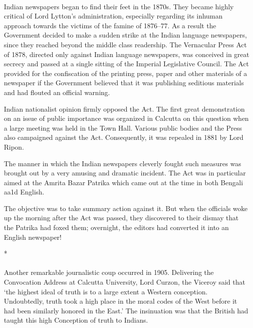 \paragraph*{}

Indian newspapers began to find their feet in the 1870s. They became highly critical of Lord Lytton's administration, especially regarding its inhuman approach towards the victims of the famine of 1876--77. As a result the Government decided to make a sudden strike at the Indian language newspapers, since they reached beyond the middle class readership. The Vernacular Press Act of 1878, directed only against Indian language newspapers, was conceived in great secrecy and passed at a single sitting of the Imperial Legislative Council. The Act provided for the confiscation of the printing press, paper and other materials of a newspaper if the Government believed that it was publishing seditious materials and had flouted an official warning.

Indian nationalist opinion firmly opposed the Act. The first great demonstration on an issue of public importance was organized in Calcutta on this question when a large meeting was held in the Town Hall. Various public bodies and the Press also campaigned against the Act. Consequently, it was repealed in 1881 by Lord Ripon.

The manner in which the Indian newspapers cleverly fought such measures was brought out by a very amusing and dramatic incident. The Act was in particular aimed at the Amrita Bazar Patrika which came out at the time in both Bengali aa1d English.

The objective was to take summary action against it. But when the officials woke up the morning after the Act was passed, they discovered to their dismay that the Patrika had foxed them; overnight, the editors had converted it into an English newspaper!

\begin{center}*\end{center}

\paragraph*{}

Another remarkable journalistic coup occurred in 1905. Delivering the Convocation Address at Calcutta University, Lord Curzon, the Viceroy said that `the highest ideal of truth is to a large extent a Western conception. Undoubtedly, truth took a high place in the moral codes of the West before it had been similarly honored in the East.' The insinuation was that the British had taught this high Conception of truth to Indians.

